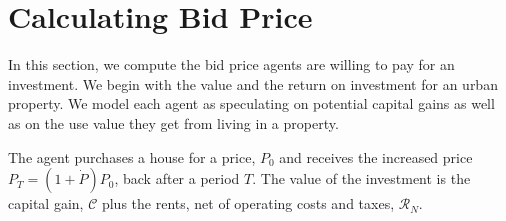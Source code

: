 \chapter[Bidding]{Calculating Bid Price}
\label{appendix-bid-price}

 In this section, we compute the bid price agents are willing to pay for an investment. We begin with the value and the return on investment for an urban property. We model each agent as %
 speculating on potential \glspl{capital gain} as well as on the \gls{use value} they get from living in a property. %

 The agent purchases a house for a price, $P_0$ %
 and receives the increased price $P_T = (1 + \dot P)P_0$, back after a period $T$. 
The value of the investment is the capital gain, $\mathcal{C}$ plus the rents, net of operating costs and taxes, $\mathcal{R}_N$.



